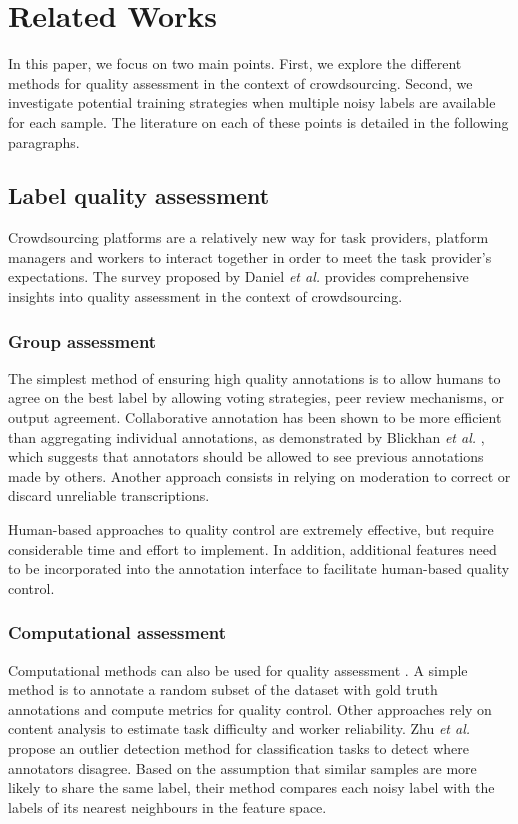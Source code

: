 \documentclass[sigconf]{acmart}
\begin{document}
\section{Related Works} 
\label{sec:related_works}

In this paper, we focus on two main points. First, we explore the different methods for quality assessment in the context of crowdsourcing. Second, we investigate potential training strategies when multiple noisy labels are available for each sample. The literature on each of these points is detailed in the following paragraphs.

\subsection{Label quality assessment}

Crowdsourcing platforms are a relatively new way for task providers, platform managers and workers to interact together in order to meet the task provider's expectations. 
The survey proposed by Daniel \textit{et al.} \cite{Daniel_2018} provides comprehensive insights into quality assessment in the context of crowdsourcing.


\subsubsection{Group assessment}
The simplest method of ensuring high quality annotations is to allow humans to agree on the best label \cite{Daniel_2018} by allowing voting strategies, peer review mechanisms, or output agreement. Collaborative annotation has been shown to be more efficient than aggregating individual annotations, as demonstrated by Blickhan \textit{et al.} \cite{zoouniverse}, which suggests that annotators should be allowed to see previous annotations made by others. 
Another approach consists in relying on moderation to correct or discard unreliable transcriptions. 

Human-based approaches to quality control are extremely effective, but require considerable time and effort to implement. In addition, additional features need to be incorporated into the annotation interface to facilitate human-based quality control.

\subsubsection{Computational assessment}

Computational methods can also be used for quality assessment \cite{Daniel_2018}.
A simple method is to annotate a random subset of the dataset with gold truth annotations and compute metrics for quality control. Other approaches rely on content analysis to estimate task difficulty and worker reliability.
Zhu \textit{et al.} \cite{Zhu2021} propose an outlier detection method for classification tasks to detect where annotators disagree. Based on the assumption that similar samples are more likely to share the same label, their method compares each noisy label with the labels of its nearest neighbours in the feature space.
\end{document}
